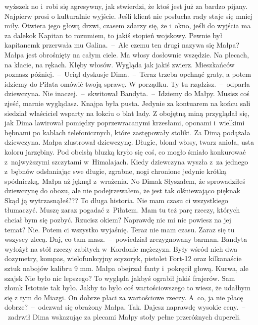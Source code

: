 \documentclass[../MAIN.tex]{subfiles}
\begin{document}
wyższe\3k no i~robi się agresywny, jak stwierdzi, że ktoś jest już za bardzo
pijany. Najpierw prosi o kulturalnie wyjście. Jeśli klient nie posłucha rady
staje się mniej miły. Otwiera jego głową drzwi, czasem zdarzy się, że i~okno,
jeśli do wyjścia ma za daleko\3k
\xx  Kapitan to rozumiem, to jakiś stopień wojskowy. Pewnie był kapitanem\3k \x
przerwała mu Galina.~--~Ale czemu ten drugi nazywa się Małpa?
\xx  Małpa jest obrośnięty na całym ciele. Ma włosy dosłownie wszędzie. Na
plecach, na klacie, na rękach. Kłęby włosów. Wygląda jak jakiś zwierz.
Mieszkańców poznasz później.~--~Uciął dyskusje Dima.~--~Teraz trzeba opchnąć
graty, a potem idziemy do Piłata omówić twoją sprawę.
\xx  W porządku. Ty tu rządzisz.~--~odparła dziewczyna.
\xx  Nie inaczej.~--~skwitował Bandyta.~--~Idziemy do Małpy. Musisz coś zjeść,
marnie wyglądasz.
\qm
Knajpa była pusta. Jedynie za kontuarem na końcu sali siedział właściciel wsparty
na łokciu o blat lady. Z obojętną miną przyglądał się, jak Dima lawirował
pomiędzy poprzewracanymi krzesłami, oponami i~wielkimi bębnami po kablach
telefonicznych, które zastępowały stoliki. Za Dimą podążała dziewczyna. Małpa
zlustrował dziewczynę. Długie, blond włosy, twarz anioła, usta koloru jarzębiny.
Pod obcisłą bluzką kryło się coś, co mogło śmiało konkurować z~najwyższymi
szczytami w~Himalajach. Kiedy dziewczyna wyszła z~za jednego z~bębnów
odsłaniając swe długie, zgrabne, nogi chronione jedynie krótką spódniczką, Małpa
aż jęknął z~wrażenia.
\sx No Dima\3k Słyszałem, że sprowadziłeś dziewczynę do obozu, ale nie
podejrzewałem, że jest tak olśniewająco piękna\3k Skąd ją wytrzasnąłeś???
\xx  To długa historia. Nie mam czasu ci wszystkiego tłumaczyć. Muszę zaraz
pogadać z~Piłatem. Mam tu też parę rzeczy, których chciał bym się pozbyć.
Rzucisz okiem?
\xx  Naprawdę nic mi nie powiesz na jej temat?
\xx  Nie. Potem ci wszystko wyjaśnię. Teraz nie mam czasu. Zaraz się tu wszyscy
zlecą.
\xx  Daj, co tam masz.~--~powiedział zrezygnowany barman.
\qm
Bandyta wyłożył na stół rzeczy zabitych w~Kordonie mężczyzn. Były wśród nich dwa
dozymetry, kompas, wielofunkcyjny scyzoryk, pistolet Fort-12 oraz kilkanaście
sztuk nabojów kalibru 9 mm. Małpa obejrzał fanty i~pokręcił głową.
\sx Kurwa, ale szajs\3k Nie było nic lepszego? To wygląda jakbyś ograbił jakiś
frajerów. Sam złom\3k
\xx  Istotnie tak było. Jakby to było coś wartościowszego to wiesz, że udałbym się
z tym do Miazgi. On dobrze płaci za wartościowe rzeczy.
\xx  A~co, ja nie płacę dobrze?~--~odezwał się obrażony Małpa.
\xx  Tak. Dajesz naprawdę wysokie ceny.~--~zadrwił Dima wskazując za plecami Małpy
stoły pełne przeróżnych dupereli.
\end{document}
